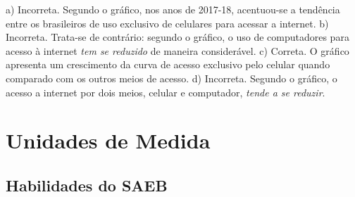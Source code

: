 \begin{escolha}
\begin{boxmedio}
\begin{boxmedio}
{\begin{boxpeq}
\begin{boxpeq}
{\begin{boxpeq}
\begin{boxmedio}
\begin{boxmedio}
\begin{boxpeq}
\begin{boxmedio}
\begin{boxpeq}
\begin{boxpeq}
\begin{boxpeq}
\begin{boxpeq}
\begin{boxmedio}
{\begin{boxmedio}
\begin{boxmedio}
\begin{boxpeq}
\begin{boxmedio}
\begin{boxpeq}
\begin{boxpeq}
\begin{boxpeq}
\begin{escolha}
{\begin{boxmedio}
\begin{boxpeq}
\begin{boxpeq}
\begin{boxpeq}
\begin{boxpeq}
\begin{boxpeq}
\begin{boxmedio}
\begin{boxpeq}
\begin{boxpeq}
\begin{boxpeq}
{\begin{boxpeq}
\begin{boxmedio}
\begin{boxpeq}
\begin{boxpeq}
\begin{boxpeq}
{\begin{boxpeq}
\begin{boxmedio}
{\begin{boxpeq}
\begin{boxpeq}
\begin{boxmedio}
\begin{boxmedio}
\begin{boxpeq}
\begin{boxpeq}
{\begin{boxpeq}
\begin{boxpeq}
\begin{boxpeq}
\begin{boxpeq}
\begin{boxpeq}
\begin{escolha}
\begin{escolha}
{\begin{boxmedio}
\begin{boxpeq}
\begin{q°}
\begin{boxmedio}
\begin{boxpeq}
\begin{boxpeq}
\begin{boxmedio}
\begin{boxmedio}
\begin{boxmedio}
\begin{boxmedio}
{a) Incorreta. Segundo o gráfico, nos anos de 2017-18, acentuou-se a tendência entre os
brasileiros de uso exclusivo de celulares para acessar a internet. 
b) Incorreta. Trata-se de contrário: segundo o gráfico, o uso de computadores para acesso
à internet \textit{tem se reduzido} de maneira considerável.
c) Correta. O gráfico apresenta um crescimento da curva de acesso exclusivo pelo
celular quando comparado com os outros meios de acesso.
d) Incorreta. Segundo o gráfico, o acesso a internet por dois meios, celular e computador,
\textit{tende a se reduzir}.}

\chapter{Unidades de Medida}

\section{Habilidades do SAEB}

\begin{itemize}


\end{itemize}
\end{boxmedio}
\end{boxmedio}
\end{boxmedio}
\end{boxmedio}
\end{boxpeq}
\end{boxpeq}
\end{boxmedio}
\end{q°}
\end{boxpeq}
\end{boxmedio}}
\end{escolha}
\end{escolha}
\end{boxpeq}
\end{boxpeq}
\end{boxpeq}
\end{boxpeq}
\end{boxpeq}}
\end{boxpeq}
\end{boxpeq}
\end{boxmedio}
\end{boxmedio}
\end{boxpeq}
\end{boxpeq}}
\end{boxmedio}
\end{boxpeq}}
\end{boxpeq}
\end{boxpeq}
\end{boxpeq}
\end{boxmedio}
\end{boxpeq}}
\end{boxpeq}
\end{boxpeq}
\end{boxpeq}
\end{boxmedio}
\end{boxpeq}
\end{boxpeq}
\end{boxpeq}
\end{boxpeq}
\end{boxpeq}
\end{boxmedio}}
\end{escolha}
\end{boxpeq}
\end{boxpeq}
\end{boxpeq}
\end{boxmedio}
\end{boxpeq}
\end{boxmedio}
\end{boxmedio}}
\end{boxmedio}
\end{boxpeq}
\end{boxpeq}
\end{boxpeq}
\end{boxpeq}
\end{boxmedio}
\end{boxpeq}
\end{boxmedio}
\end{boxmedio}
\end{boxpeq}}
\end{boxpeq}
\end{boxpeq}}
\end{boxmedio}
\end{boxmedio}
\end{escolha}
